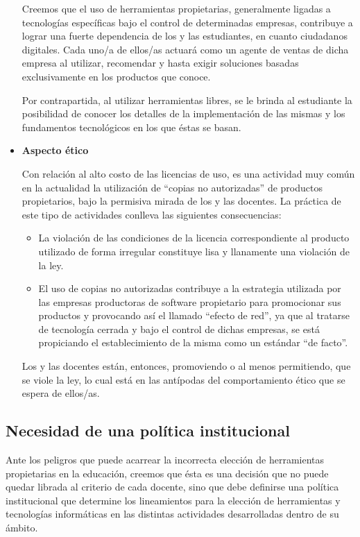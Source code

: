 \begin{itemize}
Creemos que el uso de herramientas propietarias, generalmente ligadas a tecnologías específicas bajo el control de determinadas empresas, contribuye a lograr una fuerte dependencia de los y las estudiantes, en cuanto ciudadanos digitales. Cada uno/a de ellos/as actuará como un agente de ventas de dicha empresa al utilizar, recomendar y hasta exigir soluciones basadas exclusivamente en los productos que conoce.

Por contrapartida, al utilizar herramientas libres, se le brinda al estudiante la posibilidad de conocer los detalles de la implementación de las mismas y los fundamentos tecnológicos en los que éstas se basan. 

\item {\bf Aspecto ético}

Con relación al alto costo de las licencias de uso, es una actividad muy común en  la actualidad la  utilización de ``copias no autorizadas'' de productos propietarios, bajo la permisiva mirada de los y las docentes. La práctica de este tipo de actividades conlleva las siguientes consecuencias:

\begin{itemize}
    \item La violación de las condiciones de la licencia correspondiente  al producto utilizado de forma irregular constituye lisa y llanamente una violación de la ley.

    \item El uso de copias no autorizadas contribuye a la estrategia utilizada por las empresas productoras de software propietario para promocionar sus productos y provocando así el llamado ``efecto de red'', ya que al tratarse de tecnología cerrada y bajo el control de dichas empresas, se está propiciando el establecimiento de la misma como un estándar ``de facto''.

\end{itemize}
    
Los y las docentes están, entonces, promoviendo o al menos permitiendo, que se viole la ley, lo cual está en las antípodas del comportamiento ético que se espera de ellos/as.

\end{itemize}

\subsection{Necesidad de una política institucional}

Ante los peligros que puede acarrear la incorrecta elección de herramientas propietarias en la educación, creemos que ésta es una decisión que no puede quedar librada al criterio de cada docente, sino que debe definirse una política institucional que determine los lineamientos para la elección de herramientas y tecnologías informáticas en las distintas actividades desarrolladas dentro de su ámbito.


